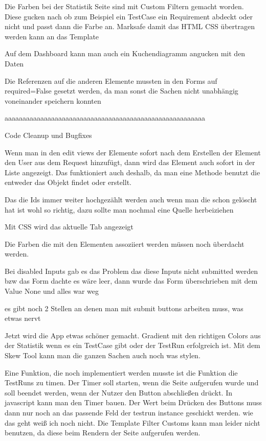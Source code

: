 \documentclass[11pt,a4paper]{report}
\begin{document}
Die Farben bei der Statistik Seite sind mit Custom Filtern gemacht worden. Diese gucken nach ob zum Beispiel ein TestCase ein Requirement abdeckt oder nicht und passt dann die Farbe an. Marksafe damit das HTML CSS übertragen werden kann an das Template

Auf dem Dashboard kann man auch ein Kuchendiagramm angucken mit den Daten


Die Referenzen auf die anderen Elemente mussten in den Forms auf required=False gesetzt werden, da man sonst die Sachen nicht unabhängig voneinander speichern konnten

aaaaaaaaaaaaaaaaaaaaaaaaaaaaaaaaaaaaaaaaaaaaaaaaaaaaaaaa

Code Cleanup und Bugfixes

Wenn man in den edit views der Elemente sofort nach dem Erstellen der Element den User aus dem Request hinzufügt, dann wird das Element auch sofort in der Liste angezeigt. Das funktioniert auch deshalb, da man eine Methode benutzt die entweder das Objekt findet oder erstellt.

Das die Ids immer weiter hochgezählt werden auch wenn man die schon gelöscht hat ist wohl so richtig, dazu sollte man nochmal eine Quelle herbeiziehen

Mit CSS wird das aktuelle Tab angezeigt

Die Farben die mit den Elementen assoziiert werden müssen noch überdacht werden.  

Bei disabled Inputs gab es das Problem das diese Inputs nicht submitted werden bzw das Form dachte es wäre leer, dann wurde das Form überschrieben mit dem Value None und alles war weg

es gibt noch 2 Stellen an denen man mit submit buttons arbeiten muss, was etwas nervt

Jetzt wird die App etwas schöner gemacht.
Gradient mit den richtigen Colors aus der Statistik wenn es ein TestCase gibt oder der TestRun erfolgreich ist.
Mit dem Skew Tool kann man die ganzen Sachen auch noch was stylen.




Eine Funktion, die noch implementiert werden musste ist die Funktion die TestRuns zu timen. Der Timer soll starten, wenn die Seite aufgerufen wurde und soll beendet werden, wenn der Nutzer den Button abschließen drückt.
In javascript kann man den Timer bauen. Der Wert beim Drücken des Buttons muss dann nur noch an das passende Feld der testrun instance geschickt werden. wie das geht weiß ich noch nicht.
Die Template Filter Customs kann man leider nicht benutzen, da diese beim Rendern der Seite aufgerufen werden. 
\end{document}
